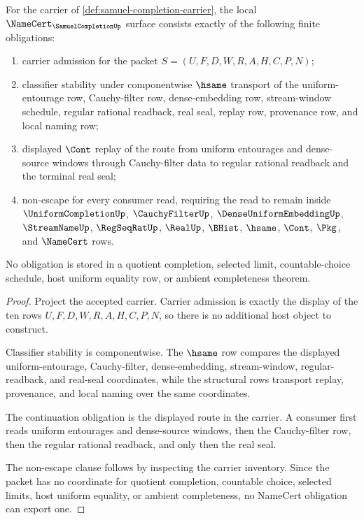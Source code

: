 \begin{theorem}
\label{thm:samuel-completion-namecert-obligations}
For the carrier of \autoref{def:samuel-completion-carrier}, the local $\NameCert_{\SamuelCompletionUp}$ surface consists exactly of the following finite obligations:
\begin{enumerate}
\item carrier admission for the packet $S=(U,F,D,W,R,A,H,C,P,N)$;
\item classifier stability under componentwise $\hsame$ transport of the uniform-entourage row, Cauchy-filter row, dense-embedding row, stream-window schedule, regular rational readback, real seal, replay row, provenance row, and local naming row;
\item displayed $\Cont$ replay of the route from uniform entourages and dense-source windows through Cauchy-filter data to regular rational readback and the terminal real seal;
\item non-escape for every consumer read, requiring the read to remain inside $\UniformCompletionUp$, $\CauchyFilterUp$, $\DenseUniformEmbeddingUp$, $\StreamNameUp$, $\RegSeqRatUp$, $\RealUp$, $\BHist$, $\hsame$, $\Cont$, $\Pkg$, and $\NameCert$ rows.
\end{enumerate}
No obligation is stored in a quotient completion, selected limit, countable-choice schedule, host uniform equality row, or ambient completeness theorem.
\end{theorem}
\begin{proof}
Project the accepted carrier. Carrier admission is exactly the display of the ten rows $U,F,D,W,R,A,H,C,P,N$, so there is no additional host object to construct.

Classifier stability is componentwise. The $\hsame$ row compares the displayed uniform-entourage, Cauchy-filter, dense-embedding, stream-window, regular-readback, and real-seal coordinates, while the structural rows transport replay, provenance, and local naming over the same coordinates.

The continuation obligation is the displayed route in the carrier. A consumer first reads uniform entourages and dense-source windows, then the Cauchy-filter row, then the regular rational readback, and only then the real seal.

The non-escape clause follows by inspecting the carrier inventory. Since the packet has no coordinate for quotient completion, countable choice, selected limits, host uniform equality, or ambient completeness, no NameCert obligation can export one.
\end{proof}

